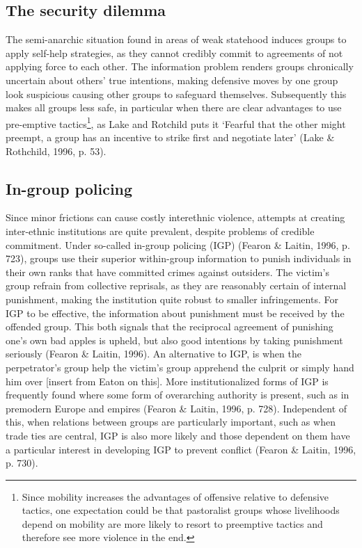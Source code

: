 \documentclass[12pt]{article}
\begin{document}
\subsection{The security dilemma}

The semi-anarchic situation found in areas of weak statehood induces groups to
apply self-help strategies, as they cannot credibly commit to agreements of not
applying force to each other. The information problem renders groups chronically
uncertain about others’ true intentions, making defensive moves by one group
look suspicious causing other groups to safeguard themselves. Subsequently this
makes all groups less safe, in particular when there are clear advantages to use
pre-emptive tactics\footnote{Since mobility increases the advantages of
	offensive relative to defensive tactics, one expectation could be that
	pastoralist groups whose livelihoods depend on mobility are more likely
	to resort to preemptive tactics and therefore see more violence in the
	end.}, as Lake and Rotchild puts it ‘Fearful that the other might
preempt, a group has an incentive to strike first and negotiate later’ (Lake \&
Rothchild, 1996, p. 53).

\subsection{In-group policing}

Since minor frictions can cause costly interethnic violence, attempts at
creating inter-ethnic institutions are quite prevalent, despite problems of
credible commitment. Under so-called in-group policing (IGP) (Fearon \& Laitin,
1996, p. 723), groups use their superior within-group information to punish
individuals in their own ranks that have committed crimes against outsiders. The
victim’s group refrain from collective reprisals, as they are reasonably certain
of internal punishment, making the institution quite robust to smaller
infringements. For IGP to be effective, the information about punishment must be
received by the offended group. This both signals that the reciprocal agreement
of punishing one’s own bad apples is upheld, but also good intentions by taking
punishment seriously (Fearon \& Laitin, 1996). An alternative to IGP, is when the
perpetrator’s group help the victim’s group apprehend the culprit or simply hand
him over [insert from Eaton on this]. More institutionalized forms of IGP is
frequently found where some form of overarching authority is present, such as in
premodern Europe and empires (Fearon \& Laitin, 1996, p. 728). Independent of
this, when relations between groups are particularly important, such as when
trade ties are central, IGP is also more likely and those dependent on them have
a particular interest in developing IGP to prevent conflict (Fearon \& Laitin,
1996, p. 730).
\end{document}
